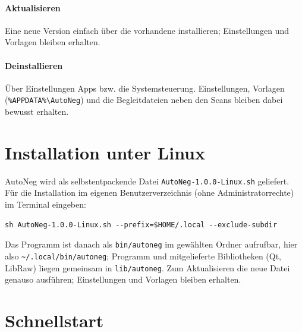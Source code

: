 \documentclass[a4paper,11pt,parskip=half,DIV=12]{scrartcl}
\newcommand{\menu}[1]{\textsf{#1}}                    %
\newcommand{\datei}[1]{\texttt{#1}}                   %
\begin{document}
\paragraph{Aktualisieren} Eine neue Version einfach über die vorhandene installieren; Einstellungen
und Vorlagen bleiben erhalten.

\paragraph{Deinstallieren} Über \menu{Einstellungen \textrightarrow{} Apps} bzw. die
Systemsteuerung. Einstellungen, Vorlagen (\datei{\%APPDATA\%\textbackslash AutoNeg}) und die
Begleitdateien neben den Scans bleiben dabei bewusst erhalten.

\section{Installation unter Linux}

AutoNeg wird als selbstentpackende Datei \datei{AutoNeg-1.0.0-Linux.sh} geliefert. Für die
Installation im eigenen Benutzerverzeichnis (ohne Administratorrechte) im Terminal eingeben:
\begin{lstlisting}
sh AutoNeg-1.0.0-Linux.sh --prefix=$HOME/.local --exclude-subdir
\end{lstlisting}
Das Programm ist danach als \datei{bin/autoneg} im gewählten Ordner aufrufbar, hier also
\datei{\textasciitilde/.local/bin/autoneg}; Programm und mitgelieferte Bibliotheken (Qt, LibRaw)
liegen gemeinsam in \datei{lib/autoneg}. Zum Aktualisieren die neue Datei genauso
ausführen; Einstellungen und Vorlagen bleiben erhalten.

\section{Schnellstart}
\end{document}
